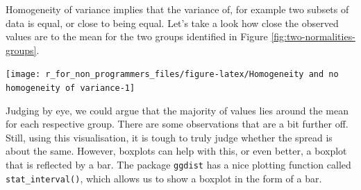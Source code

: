 \documentclass[
]{book}
\newenvironment{Shaded}{\begin{snugshade}}{\end{snugshade}}
\newcommand{\AttributeTok}[1]{\textcolor[rgb]{0.77,0.63,0.00}{#1}}
\newcommand{\DecValTok}[1]{\textcolor[rgb]{0.00,0.00,0.81}{#1}}
\newcommand{\FloatTok}[1]{\textcolor[rgb]{0.00,0.00,0.81}{#1}}
\newcommand{\FunctionTok}[1]{\textcolor[rgb]{0.00,0.00,0.00}{#1}}
\newcommand{\NormalTok}[1]{#1}
\newcommand{\SpecialCharTok}[1]{\textcolor[rgb]{0.00,0.00,0.00}{#1}}
\newcommand{\StringTok}[1]{\textcolor[rgb]{0.31,0.60,0.02}{#1}}
\begin{document}
Homogeneity of variance implies that the variance of, for example two subsets of data is equal, or close to being equal. Let's take a look how close the observed values are to the mean for the two groups identified in Figure \ref{fig:two-normalities-groups}.

\begin{Shaded}
\end{Shaded}

\begin{center}\texttt{[image: r\_for\_non\_programmers\_files/figure-latex/Homogeneity and no homogeneity of variance-1]} \end{center}

Judging by eye, we could argue that the majority of values lies around the mean for each respective group. There are some observations that are a bit further off. Still, using this visualisation, it is tough to truly judge whether the spread is about the same. However, boxplots can help with this, or even better, a boxplot that is reflected by a bar. The package \texttt{ggdist} has a nice plotting function called \texttt{stat\_interval()}, which allows us to show a boxplot in the form of a bar.
\end{document}
